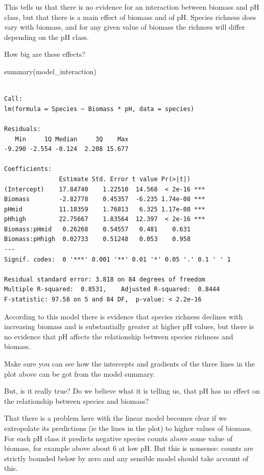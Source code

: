 \documentclass[
  letterpaper,
  DIV=11,
  numbers=noendperiod]{scrreprt}
\newenvironment{Shaded}{\begin{snugshade}}{\end{snugshade}}
\newcommand{\FunctionTok}[1]{\textcolor[rgb]{0.28,0.35,0.67}{#1}}
\newcommand{\NormalTok}[1]{\textcolor[rgb]{0.00,0.23,0.31}{#1}}
\begin{document}
This tells us that there is no evidence for an interaction between
biomass and pH class, but that there is a main effect of biomass and of
pH. Species richness does vary with biomass, and for any given value of
biomass the richness will differ depending on the pH class.

How big are these effects?

\begin{Shaded}
\begin{Highlighting}[]
\FunctionTok{summary}\NormalTok{(model\_interaction)}
\end{Highlighting}
\end{Shaded}

\begin{verbatim}

Call:
lm(formula = Species ~ Biomass * pH, data = species)

Residuals:
   Min     1Q Median     3Q    Max 
-9.290 -2.554 -0.124  2.208 15.677 

Coefficients:
               Estimate Std. Error t value Pr(>|t|)    
(Intercept)    17.84740    1.22510  14.568  < 2e-16 ***
Biomass        -2.82778    0.45357  -6.235 1.74e-08 ***
pHmid          11.18359    1.76813   6.325 1.17e-08 ***
pHhigh         22.75667    1.83564  12.397  < 2e-16 ***
Biomass:pHmid   0.26268    0.54557   0.481    0.631    
Biomass:pHhigh  0.02733    0.51248   0.053    0.958    
---
Signif. codes:  0 '***' 0.001 '**' 0.01 '*' 0.05 '.' 0.1 ' ' 1

Residual standard error: 3.818 on 84 degrees of freedom
Multiple R-squared:  0.8531,    Adjusted R-squared:  0.8444 
F-statistic: 97.58 on 5 and 84 DF,  p-value: < 2.2e-16
\end{verbatim}

According to this model there is evidence that species richness declines
with increasing biomass and is substantially greater at higher pH
values, but there is no evidence that pH affects the relationship
between species richness and biomass.

Make sure you can see how the intercepts and gradients of the three
lines in the plot above can be got from the model summary.

But, is it really true? Do we believe what it is telling us, that pH has
no effect on the relationship between species and biomass?

That there is a problem here with the linear model becomes clear if we
extropolate its predictions (ie the lines in the plot) to higher values
of biomass. For each pH class it predicts negative species counts above
some value of biomass, for example above about 6 at low pH. But this is
nonsense: counts are strictly bounded below by zero and any sensible
model should take account of this.
\end{document}
